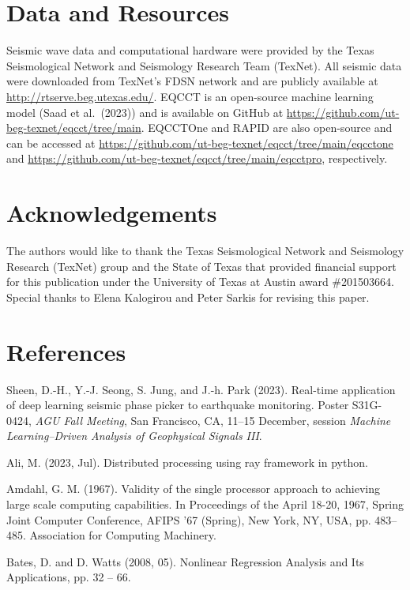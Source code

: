 \section{Data and Resources}

Seismic wave data and computational hardware were provided by the Texas Seismological Network and Seismology Research Team (TexNet). All seismic data were downloaded from TexNet's FDSN network and are publicly available at \url{http://rtserve.beg.utexas.edu/}. EQCCT is an open-source machine learning model (Saad et al.\ (2023)) and is available on GitHub at \url{https://github.com/ut-beg-texnet/eqcct/tree/main}. EQCCTOne and RAPID are also open-source and can be accessed at \url{https://github.com/ut-beg-texnet/eqcct/tree/main/eqcctone} and \url{https://github.com/ut-beg-texnet/eqcct/tree/main/eqcctpro}, respectively.

\section{Acknowledgements}

The authors would like to thank the Texas Seismological Network and Seismology Research (TexNet) group and the State of Texas that provided financial support for this publication under the University of Texas at Austin award \#201503664. Special thanks to Elena Kalogirou and Peter Sarkis for revising this paper.

\section{References}

Sheen, D.-H., Y.-J. Seong, S. Jung, and J.-h. Park (2023). Real-time application of deep learning seismic phase picker to earthquake monitoring. Poster S31G-0424, \emph{AGU Fall Meeting}, San Francisco, CA, 11–15 December, session \emph{Machine Learning–Driven Analysis of Geophysical Signals III}.

Ali, M. (2023, Jul). Distributed processing using ray framework in python.

Amdahl, G. M. (1967). Validity of the single processor approach to achieving large scale computing capabilities. In Proceedings of the April 18-20, 1967, Spring Joint Computer Conference, AFIPS ’67 (Spring), New York, NY, USA, pp. 483–485. Association for Computing Machinery.

Bates, D. and D. Watts (2008, 05). Nonlinear Regression Analysis and Its Applications, pp. 32 – 66.

